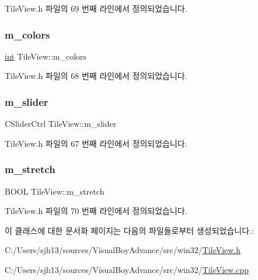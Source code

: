Tile\+View.\+h 파일의 69 번째 라인에서 정의되었습니다.

\mbox{\label{class_tile_view_ad61048a17d2a93f3b8cb413d17a1533a}} 
\subsubsection{\texorpdfstring{m\+\_\+colors}{m\_colors}}
{\footnotesize\ttfamily \mbox{\hyperlink{_util_8cpp_a0ef32aa8672df19503a49fab2d0c8071}{int}} Tile\+View\+::m\+\_\+colors}



Tile\+View.\+h 파일의 68 번째 라인에서 정의되었습니다.

\mbox{\label{class_tile_view_a3423f8bf0fe4b1bd0273d9ffbd3fb390}} 
\subsubsection{\texorpdfstring{m\+\_\+slider}{m\_slider}}
{\footnotesize\ttfamily C\+Slider\+Ctrl Tile\+View\+::m\+\_\+slider}



Tile\+View.\+h 파일의 67 번째 라인에서 정의되었습니다.

\mbox{\label{class_tile_view_a21a8f1dc56ad2e1107719d64fb206d2e}} 
\subsubsection{\texorpdfstring{m\+\_\+stretch}{m\_stretch}}
{\footnotesize\ttfamily B\+O\+OL Tile\+View\+::m\+\_\+stretch}



Tile\+View.\+h 파일의 70 번째 라인에서 정의되었습니다.



이 클래스에 대한 문서화 페이지는 다음의 파일들로부터 생성되었습니다.\+:\begin{DoxyCompactItemize}
\item 
C\+:/\+Users/sjh13/sources/\+Visual\+Boy\+Advance/src/win32/\mbox{\hyperlink{_tile_view_8h}{Tile\+View.\+h}}\item 
C\+:/\+Users/sjh13/sources/\+Visual\+Boy\+Advance/src/win32/\mbox{\hyperlink{_tile_view_8cpp}{Tile\+View.\+cpp}}\end{DoxyCompactItemize}
